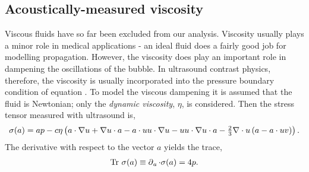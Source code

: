\subsection{Acoustically-measured viscosity}\label{sec:viscosity}

Viscous fluids have so far been excluded from our analysis.
Viscosity usually plays a minor role in medical applications - 
an ideal fluid does a fairly good job for modelling propagation.
However, the viscosity does play an important role in dampening the oscillations of the bubble.
In ultrasound contrast physics, therefore, the viscosity is usually incorporated into the pressure boundary condition of equation .
To model the viscous dampening it is assumed that the fluid is Newtonian; only the  {\em  dynamic viscosity}, $\eta$, is considered. %
Then the stress tensor measured with ultrasound is\cite{LandauBook}, 
\begin{align}
  \sigma(a) = a p - c\eta \left( a \cdot \nabla u + \nabla u\cdot a - a\cdot u u\cdot \nabla u - u u \cdot \nabla  u\cdot a -\tfrac{2}{3}\nabla \cdot u \left( a - a\cdot u v \right) \right).\label{eqn:RelStress}
\end{align}
The derivative with respect to the vector $a$ yields the trace\cite{Hestenes1984},
\begin{align}
  \textrm{Tr}\ \sigma(a) \equiv \operatorname{\partial}_a \cdot \sigma(a) = 4p. \label{eqn:RelStressTrace} 
\end{align}
